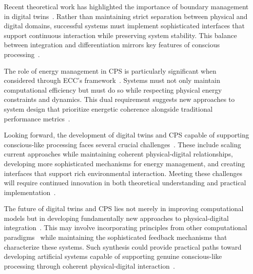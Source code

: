 Recent theoretical work has highlighted the importance of boundary management in digital twins~\cite{Lee2018,Wolf2020}. Rather than maintaining strict separation between physical and digital domains, successful systems must implement sophisticated interfaces that support continuous interaction while preserving system stability. This balance between integration and differentiation mirrors key features of conscious processing~\cite{Rajkumar2018,tononi2015consciousness2dup}.

The role of energy management in CPS is particularly significant when considered through ECC's framework~\cite{Grieves2021,England2018}. Systems must not only maintain computational efficiency but must do so while respecting physical energy constraints and dynamics. This dual requirement suggests new approaches to system design that prioritize energetic coherence alongside traditional performance metrics~\cite{Liu2021,Still2020}.

Looking forward, the development of digital twins and CPS capable of supporting conscious-like processing faces several crucial challenges~\cite{Tao2019,Fuller2020}. These include scaling current approaches while maintaining coherent physical-digital relationships, developing more sophisticated mechanisms for energy management, and creating interfaces that support rich environmental interaction. Meeting these challenges will require continued innovation in both theoretical understanding and practical implementation~\cite{Uhlemann2017,Wolpert2019}.

The future of digital twins and CPS lies not merely in improving computational models but in developing fundamentally new approaches to physical-digital integration~\cite{Wang2019,Rasheed2020}. This may involve incorporating principles from other computational paradigms~ while maintaining the sophisticated feedback mechanisms that characterize these systems. Such synthesis could provide practical paths toward developing artificial systems capable of supporting genuine conscious-like processing through coherent physical-digital interaction~\cite{White2021,hunt2024electromagnetic}.

